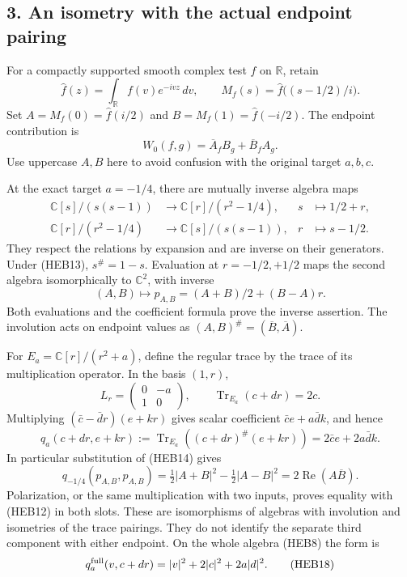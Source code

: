 \documentclass[
  10pt,
  a4paper,
]{article}
\begin{document}
\subsection{3. An isometry with the actual endpoint
pairing}\label{an-isometry-with-the-actual-endpoint-pairing}

For a compactly supported smooth complex test \(f\) on \(\mathbb R\),
retain \[
\widehat f(z)=\int_{\mathbb R}f(v)e^{-ivz}\,dv,
\qquad M_f(s)=\widehat f\bigl((s-1/2)/i\bigr).
\tag{HEB11}
\] Set \(A=M_f(0)=\widehat f(i/2)\) and \(B=M_f(1)=\widehat f(-i/2)\).
The endpoint contribution is \[
W_0(f,g)=\overline A_f B_g+\overline B_f A_g.
\tag{HEB12}
\] Use uppercase \(A,B\) here to avoid confusion with the original
target \(a,b,c\).

At the exact target \(a=-1/4\), there are mutually inverse algebra maps
\[
\begin{aligned}
\mathbb C[s]/(s(s-1))&\longrightarrow
\mathbb C[r]/(r^2-1/4),&s&\longmapsto1/2+r,\\
\mathbb C[r]/(r^2-1/4)&\longrightarrow
\mathbb C[s]/(s(s-1)),&r&\longmapsto s-1/2.
\end{aligned}\tag{HEB13}
\] They respect the relations by expansion and are inverse on their
generators. Under (HEB13), \(s^\#=1-s\). Evaluation at \(r=-1/2,+1/2\)
maps the second algebra isomorphically to \(\mathbb C^2\), with inverse
\[
(A,B)\longmapsto p_{A,B}=(A+B)/2+(B-A)r.
\tag{HEB14}
\] Both evaluations and the coefficient formula prove the inverse
assertion. The involution acts on endpoint values as
\((A,B)^\#=(\overline B,\overline A)\).

For \(E_a=\mathbb C[r]/(r^2+a)\), define the regular trace by the trace
of its multiplication operator. In the basis \((1,r)\), \[
L_r=\begin{pmatrix}0&-a\\1&0\end{pmatrix},\qquad
\operatorname{Tr}_{E_a}(c+dr)=2c.
\tag{HEB15}
\] Multiplying \((\bar c-\bar d r)(e+kr)\) gives scalar coefficient
\(\bar ce+a\bar dk\), and hence \[
q_a(c+dr,e+kr):=\operatorname{Tr}_{E_a}((c+dr)^\#(e+kr))
=2\bar ce+2a\bar dk.
\tag{HEB16}
\] In particular substitution of (HEB14) gives \[
q_{-1/4}(p_{A,B},p_{A,B})
=\tfrac12|A+B|^2-\tfrac12|A-B|^2
=2\operatorname{Re}(A\overline B).
\tag{HEB17}
\] Polarization, or the same multiplication with two inputs, proves
equality with (HEB12) in both slots. These are isomorphisms of algebras
with involution and isometries of the trace pairings. They do not
identify the separate third component with either endpoint. On the whole
algebra (HEB8) the form is \[
q^{\rm full}_a(v,c+dr)=|v|^2+2|c|^2+2a|d|^2.
\tag{HEB18}
\]
\end{document}
